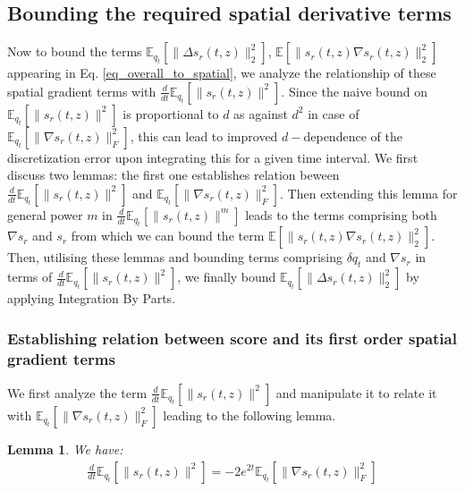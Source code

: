 \documentclass{article}
\newtheorem{lemma}{Lemma}[section]
\begin{document}
\subsection{Bounding the required spatial derivative terms}

\noindent
Now to bound the terms $\mathbb{E}_{q_t}\left[\|\Delta s_r(t,z) \|^2_2\right]$, $\mathbb{E}\left[\|s_r(t,z)\nabla s_r(t,z) \|^2_2\right]$ appearing in Eq. \ref{eq_overall_to_spatial}, we analyze the relationship of these spatial gradient terms with $\frac{d}{dt}\mathbb{E}_{q_t}\left[\|s_r(t,z)\|^2\right]$. Since the naive bound on $\mathbb{E}_{q_t}\left[\|s_r(t,z)\|^2\right]$ is proportional to $d$ as against $d^2$ in case of $\mathbb{E}_{q_t}\left[\|\nabla s_r(t,z)\|_F^2\right]$, this can lead to improved $d-$dependence of the discretization error upon integrating this for a given time interval. We first discuss two lemmas: the first one establishes relation beween $\frac{d}{dt}\mathbb{E}_{q_t}[\|s_r(t,z)\|^2]$ and 
$\mathbb{E}_{q_t}[\|\nabla s_r(t,z)\|^2_F]$. Then extending this lemma for general power $m$ in $\frac{d}{dt}\mathbb{E}_{q_t}[\|s_r(t,z)\|^m]$ leads to the terms comprising both $\nabla s_r$ and $s_r$  from which we can bound the term $\mathbb{E}\left[\|s_r(t,z)\nabla s_r(t,z) \|^2_2\right]$. Then, utilising these lemmas and bounding terms comprising $\delta q_t$ and $\nabla s_r$ in terms of $\frac{d}{dt}\mathbb{E}_{q_t}\left[\|s_r(t,z)\|^2\right]$, we finally bound $\mathbb{E}_{q_t}\left[\|\Delta s_r(t,z) \|^2_2\right]$ by applying Integration By Parts.

\subsubsection{Establishing relation between score and its first order spatial gradient terms}
\noindent
We first analyze the term $\frac{d}{dt}\mathbb{E}_{q_t}[\|s_r(t,z)\|^2]$ and manipulate it to relate it with $\mathbb{E}_{q_t}[\|\nabla s_r(t,z)\|^2_F]$ leading to the following lemma.

 

\begin{lemma}
\label{spatial_time_relation}
 We have:
\begin{align*}
    \frac{d}{dt}\mathbb{E}_{q_t}[\|s_r(t,z)\|^2] = -2e^{2t}\mathbb{E}_{q_t}[\|\nabla s_r(t,z)\|^2_F]
\end{align*}
\end{lemma}
\end{document}

